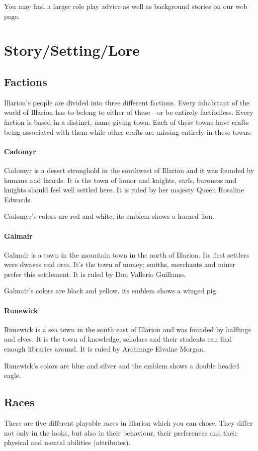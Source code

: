 \documentclass[a4paper,11pt]{scrreprt}
\begin{document}
You may find a larger role play advice as well as background stories on our web page. 

\section{Story/Setting/Lore}
\subsection{Factions}
Illarion's people are divided into three different factions. Every inhabitant of the world of Illarion has to belong to either of these---or be entirely factionless. Every faction is based in a distinct, name-giving town. Each of these towns have crafts being associated with them while other crafts are missing entirely in these towns.
\paragraph{Cadomyr}
Cadomyr is a desert stronghold in the southwest of Illarion and it was founded by humans and lizards. It is the town of honor and knights, earls, baroness and knights should feel 
well settled here. It is ruled by her majesty Queen Rosaline Edwards.

Cadomyr's colors are red and white, its emblem shows a horned lion. 

\paragraph{Galmair}
Galmair is a town in the mountain town in the north of Illarion. Its first settlers were dwaves and 
orcs. It's the town of money; smiths, merchants and miner prefer this settlement. It is ruled by Don Vallerio 
Guillamo.

Galmair's colors are black and yellow, its emblem shows a winged pig. 

\paragraph{Runewick}
Runewick is a sea town in the south east of Illarion and was founded by halflings and elves.
It is the town of knowledge, scholars and their students can find enough libraries around. 
It is ruled by Archmage Elvaine Morgan.

Runewick's colors are blue and silver and the emblem shows a double headed eagle.

\subsection{Races}
There are five different playable races in Illarion which you can chose. They differ not only in the looks, but also in their behaviour, their preferences and their physical and mental abilities (attributes).
\end{document}
